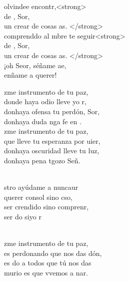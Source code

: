 \documentclass[12pt]{article}
\begin{document}
\begin{multicols*}{2}
\begin{cancion}
	olvindee encontr,<strong> \\
	 de , Sor,  \\
	un crear de cosas as. </strong>\\
	comprenddo al mbre  te seguir<strong>\\
	 de , Sor,  \\
	un crear de cosas as. </strong>\\
	¡oh Seor, séñame ae,\\
	enñame a querer! \\
\end{cancion}%

\begin{cancion}%
	zme instrumento de tu paz,\\
	donde haya odio lleve yo r,\\
	donhaya ofensa tu perdón, Sor,\\
	donhaya duda nga fe en . \\
\jump
	zme instrumento de tu paz,\\
	que lleve tu esperanza por uier,\\
	donhaya oscuridad lleve tu luz,\\
	donhaya pena tgozo Señ. \\\jump\\
	\begin{chorus}%
	stro ayúdame a nuncaur\\
	querer  consol sino cso,\\
	ser crendido sino comprenr,\\
	ser do siyo r\\
	\end{chorus}%
	\jump\\
	zme instrumento de tu paz,\\
	es perdonando que nos das dón,\\
	es do a todos que tú nos das\\
	murio es que vvemos a nar.\\
\end{cancion}%


\end{multicols*}
\end{document}
